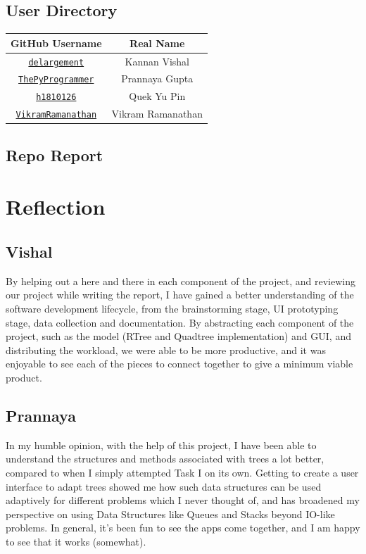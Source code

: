 \documentclass[12pt]{article}
\begin{document}
{\subsection{User Directory}
\begin{center}
    \begin{tabular}{|c|c|}
        \hline
        GitHub Username & Real Name \\
        \hline
        \href{https://github.com/delargement}{\texttt{delargement}} & Kannan Vishal \\
        \href{https://github.com/ThePyProgrammer}{\texttt{ThePyProgrammer}} & Prannaya Gupta \\
        \href{https://github.com/h1810126}{\texttt{h1810126}} & Quek Yu Pin \\
        \href{https://github.com/VikramRamanathan}{\texttt{VikramRamanathan}} & Vikram Ramanathan \\
        \hline
    \end{tabular}
\end{center}


\subsection{Repo Report}

\section{Reflection}

\subsection{Vishal}

By helping out a here and there in each component of the project, and reviewing our project while writing the report, I have gained a better understanding of the software development lifecycle, from the brainstorming stage, UI prototyping stage, data collection and documentation. By abstracting each component of the project, such as the model (RTree and Quadtree implementation) and GUI, and distributing the workload, we were able to be more productive, and it was enjoyable to see each of the pieces to connect together to give a minimum viable product.

\subsection{Prannaya}
In my humble opinion, with the help of this project, I have been able to understand the structures and methods associated with trees a lot better, compared to when I simply attempted Task I on its own. Getting to create a user interface to adapt trees showed me how such data structures can be used adaptively for different problems which I never thought of, and has broadened my perspective on using Data Structures like Queues and Stacks beyond IO-like problems. In general, it's been fun to see the apps come together, and I am happy to see that it works (somewhat).

}
\end{document}
